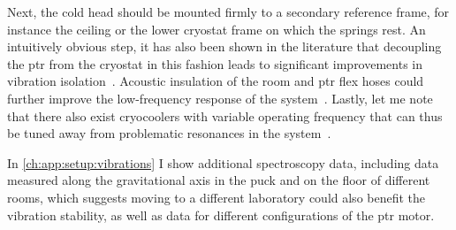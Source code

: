 Next, the cold head should be mounted firmly to a secondary reference frame, for instance the ceiling or the lower cryostat frame on which the springs rest.
An intuitively obvious step, it has also been shown in the literature that decoupling the \gls{ptr} from the cryostat in this fashion leads to significant improvements in vibration isolation~\cite{Olivieri2017}.
Acoustic insulation of the room and \gls{ptr} flex hoses could further improve the low-frequency response of the system~\cite{Schmoranzer2019,Oh2021}.
Lastly, let me note that there also exist cryocoolers with variable operating frequency that can thus be tuned away from problematic resonances in the system~\cite{TransMitPTR}.

In \cref{ch:app:setup:vibrations} I show additional spectroscopy data, including data measured along the gravitational axis in the puck and on the floor of different rooms, which suggests moving to a different laboratory could also benefit the vibration stability, as well as data for different configurations of the \gls{ptr} motor.
